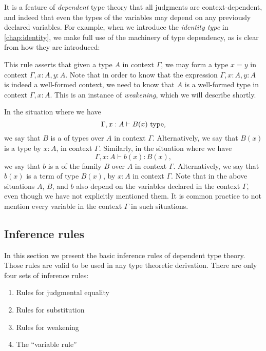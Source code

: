 It is a feature of \emph{dependent} type theory that all judgments are context-dependent, and indeed that even the types of the variables may depend on any previously declared variables. For example, when we introduce the \emph{identity type} in \cref{chap:identity}, we make full use of the machinery of type dependency, as is clear from how they are introduced:
\begin{prooftree}
\end{prooftree}
This rule asserts that given a type $A$ in context $\Gamma$, we may form a type $x=y$ in context $\Gamma,x:A,y:A$. Note that in order to know that the expression $\Gamma,x:A,y:A$ is indeed a well-formed context, we need to know that $A$ is a well-formed type in context $\Gamma,x:A$. This is an instance of \emph{weakening}, which we will describe shortly.

In the situation where we have
\begin{equation*}
  \Gamma,x:A\vdash B(x)~\type,
\end{equation*}
we say that $B$ is a  of types over $A$ in context $\Gamma$. Alternatively, we say that $B(x)$ is a type  by $x:A$, in context $\Gamma$. Similarly, in the situation where we have
\begin{equation*}
  \Gamma,x:A\vdash b(x):B(x),
\end{equation*}
we say that $b$ is a  of the family $B$ over $A$ in context $\Gamma$. Alternatively, we say that $b(x)$ is a term of type $B(x)$,  by $x:A$ in context $\Gamma$. Note that in the above situations $A$, $B$, and $b$ also depend on the variables declared in the context $\Gamma$, even though we have not explicitly mentioned them. It is common practice to not mention every variable in the context $\Gamma$ in such situations.


\subsection{Inference rules}\label{sec:rules}

In this section we present the basic inference rules of dependent type theory. Those rules are valid to be used in any type theoretic derivation. There are only four sets of inference rules:
\begin{enumerate}
\item Rules for judgmental equality 
\item Rules for substitution
\item Rules for weakening
\item The ``variable rule''
\end{enumerate}

